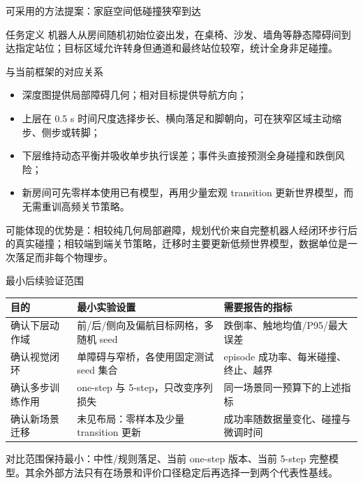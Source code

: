 \documentclass[aspectratio=169,10pt]{beamer}
\begin{document}
\begin{frame}{可采用的方法提案：家庭空间低碰撞狭窄到达}
\small
\begin{block}{任务定义}
机器人从房间随机初始位姿出发，在桌椅、沙发、墙角等静态障碍间到达指定站位；目标区域允许转身但通道和最终站位较窄，统计全身非足碰撞。
\end{block}
\begin{block}{与当前框架的对应关系}
\begin{itemize}
  \item 深度图提供局部障碍几何；相对目标提供导航方向；
  \item 上层在 0.5 s 时间尺度选择步长、横向落足和脚朝向，可在狭窄区域主动缩步、侧步或转脚；
  \item 下层维持动态平衡并吸收单步执行误差；事件头直接预测全身碰撞和跌倒风险；
  \item 新房间可先零样本使用已有模型，再用少量宏观 transition 更新世界模型，而无需重训高频关节策略。
\end{itemize}
\end{block}
可能体现的优势是：相较纯几何局部避障，规划代价来自完整机器人经闭环步行后的真实碰撞；相较端到端关节策略，迁移时主要更新低频世界模型，数据单位是一次落足而非每个物理步。
\end{frame}

\begin{frame}{最小后续验证范围}
\small
\begin{tabular}{p{}p{}p{}}
\toprule
目的 & 最小实验设置 & 需要报告的指标\\
\midrule
确认下层动作域 & 前/后/侧向及偏航目标网格，多随机 seed & 跌倒率、触地均值/P95/最大误差\\
确认视觉闭环 & 单障碍与窄桥，各使用固定测试 seed 集合 & episode 成功率、每米碰撞、终止、越界\\
确认多步训练作用 & one-step 与 5-step，只改变序列损失 & 同一场景同一预算下的上述指标\\
确认新场景迁移 & 未见布局：零样本及少量 transition 更新 & 成功率随数据量变化、碰撞与微调时间\\
\bottomrule
\end{tabular}
\vspace{0.8em}
对比范围保持最小：中性/规则落足、当前 one-step 版本、当前 5-step 完整模型。其余外部方法只有在场景和评价口径稳定后再选择一到两个代表性基线。
\end{frame}
\end{document}

